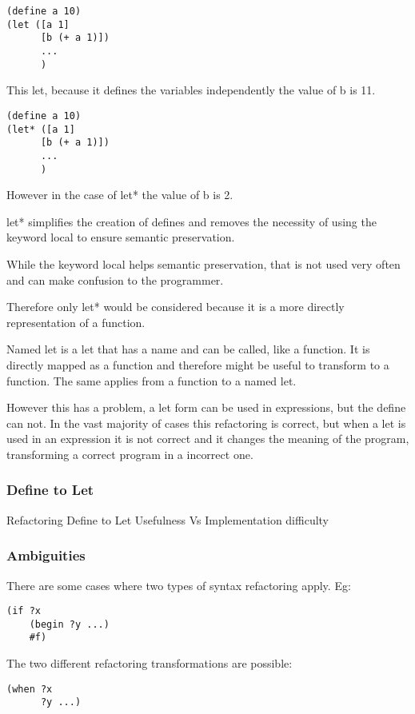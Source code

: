 \begin{lstlisting}[caption="Example"]
(define a 10)
(let ([a 1]
      [b (+ a 1)])
      ...
      )
\end{lstlisting}
This let, because it defines the variables independently the value of b is 11.

\begin{lstlisting}[caption="Example"]
(define a 10)
(let* ([a 1]
      [b (+ a 1)])
      ...
      )
\end{lstlisting}
However in the case of let* the value of b is 2.

let* simplifies the creation of defines and removes the necessity of using the
keyword local to ensure semantic preservation.

While the keyword local helps semantic preservation, that is not used very often
and can make confusion to the programmer.

Therefore only let* would be considered because it is a more directly
representation of a function.

Named let is a let that has a name and can be called, like a function.
It is directly mapped as a function and therefore might be useful to transform to a function.
The same applies from a function to a named let.

However this has a problem, a let form can be used in expressions, but the define can not.
In the vast majority of cases this refactoring is correct, but when a let is used in an expression
it is not correct and it changes the meaning of the program, transforming a correct
program in a incorrect one.


\subsubsection{Define to Let}
Refactoring Define to Let Usefulness Vs Implementation difficulty

\subsubsection{Ambiguities}
There are some cases where two types of syntax refactoring apply.
Eg:
\begin{lstlisting}[caption="Example"]
(if ?x
    (begin ?y ...)
    #f)
\end{lstlisting}
The two different refactoring transformations are possible:
\begin{lstlisting}[caption="Example"]
(when ?x
      ?y ...)
\end{lstlisting}

